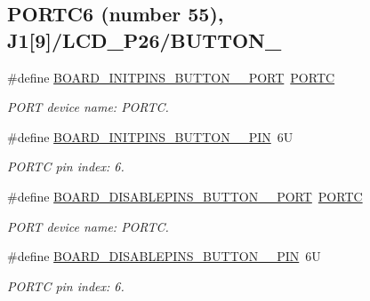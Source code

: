 \subsection*{P\+O\+R\+T\+C6 (number 55), J1\mbox{[}9\mbox{]}/\+L\+C\+D\+\_\+\+P26/\+B\+U\+T\+T\+O\+N\+\_}
\begin{DoxyCompactItemize}
\item 
\mbox{\label{group__pin__mux_gac388e5527f9612be20d79c4730f66918}} 
\#define \mbox{\hyperlink{group__pin__mux_gac388e5527f9612be20d79c4730f66918}{B\+O\+A\+R\+D\+\_\+\+I\+N\+I\+T\+P\+I\+N\+S\+\_\+\+B\+U\+T\+T\+O\+N\+\_\+\_\+\+P\+O\+RT}}~\mbox{\hyperlink{group___p_o_r_t___peripheral___access___layer_ga68fea88642279a70246e026e7221b0a5}{P\+O\+R\+TC}}
\begin{DoxyCompactList}\small\item\em P\+O\+RT device name\+: P\+O\+R\+TC. \end{DoxyCompactList}\item 
\mbox{\label{group__pin__mux_gaeecd116d20a6b37190f46e2c65764ad7}} 
\#define \mbox{\hyperlink{group__pin__mux_gaeecd116d20a6b37190f46e2c65764ad7}{B\+O\+A\+R\+D\+\_\+\+I\+N\+I\+T\+P\+I\+N\+S\+\_\+\+B\+U\+T\+T\+O\+N\+\_\+\_\+\+P\+IN}}~6U
\begin{DoxyCompactList}\small\item\em P\+O\+R\+TC pin index\+: 6. \end{DoxyCompactList}\item 
\mbox{\label{group__pin__mux_ga75837d070bfc817112935100ab740c5c}} 
\#define \mbox{\hyperlink{group__pin__mux_ga75837d070bfc817112935100ab740c5c}{B\+O\+A\+R\+D\+\_\+\+D\+I\+S\+A\+B\+L\+E\+P\+I\+N\+S\+\_\+\+B\+U\+T\+T\+O\+N\+\_\+\_\+\+P\+O\+RT}}~\mbox{\hyperlink{group___p_o_r_t___peripheral___access___layer_ga68fea88642279a70246e026e7221b0a5}{P\+O\+R\+TC}}
\begin{DoxyCompactList}\small\item\em P\+O\+RT device name\+: P\+O\+R\+TC. \end{DoxyCompactList}\item 
\mbox{\label{group__pin__mux_gae27324c9c689b5df3b291b199b161a96}} 
\#define \mbox{\hyperlink{group__pin__mux_gae27324c9c689b5df3b291b199b161a96}{B\+O\+A\+R\+D\+\_\+\+D\+I\+S\+A\+B\+L\+E\+P\+I\+N\+S\+\_\+\+B\+U\+T\+T\+O\+N\+\_\+\_\+\+P\+IN}}~6U
\begin{DoxyCompactList}\small\item\em P\+O\+R\+TC pin index\+: 6. \end{DoxyCompactList}\end{DoxyCompactItemize}
